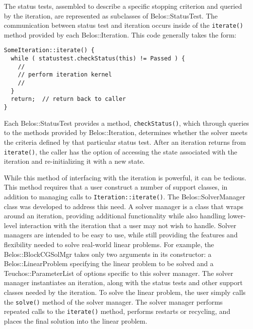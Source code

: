 The status tests, assembled to describe a specific stopping criterion and queried by the 
iteration, are represented as subclasses of Belos::StatusTest. The
communication between status test and iteration occurs
inside of the \verb!iterate()! method provided by each Belos::Iteration. This code
generally takes the form:
\begin{verbatim}
SomeIteration::iterate() {
  while ( statustest.checkStatus(this) != Passed ) {
    //
    // perform iteration kernel
    //
  }
  return;  // return back to caller
}
\end{verbatim}

Each Belos::StatusTest provides a method, \verb!checkStatus()!, which through queries to
the methods provided by Belos::Iteration, determines whether the solver meets the
criteria defined by that particular status test. After an iteration returns from
\verb!iterate()!, the caller has the option of accessing the state associated with the
iteration and re-initializing it with a new state.

While this method of interfacing with the iteration is powerful, it can be tedious.
This method requires that a user construct a number of support classes, in addition to
managing calls to \verb!Iteration::iterate()!.  The Belos::SolverManager class was developed to
address this need. A solver manager is a class that wraps around an iteration,
providing additional functionality while also handling lower-level interaction with the
iteration that a user may not wish to handle. Solver managers are intended to be 
easy to use, while still providing the features and flexibility needed to solve real-world
linear problems. For example, the Belos::BlockCGSolMgr takes only two
arguments in its constructor: a Belos::LinearProblem specifying the linear problem
to be solved and a Teuchos::ParameterList of options specific to this solver manager. The
solver manager instantiates an iteration, along with the status tests and other support
classes needed by the iteration. To solve the linear problem, the user simply calls
the \verb!solve()! method of the solver manager. The solver manager performs repeated
calls to the \verb!iterate()! method, performs restarts or recycling, and
places the final solution into the linear problem.

